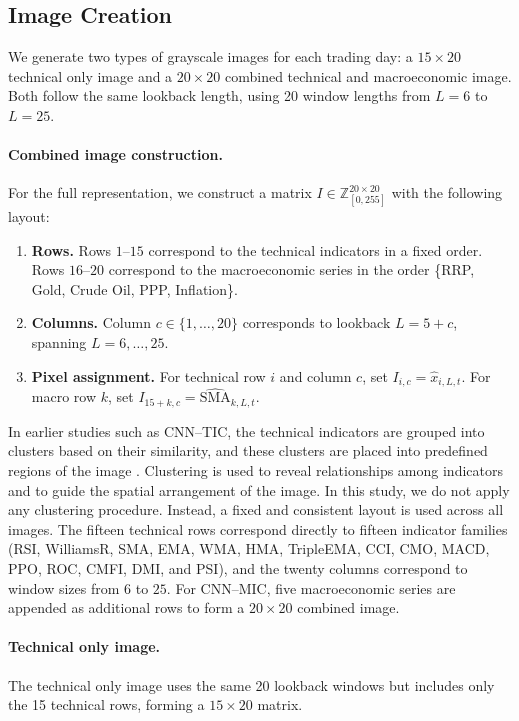 \documentclass[12pt,a4paper]{article}
\begin{document}
\subsection{Image Creation} \label{subsec:image-creation}
We generate two types of grayscale images for each trading day: a $15 \times 20$ technical only image and a $20 \times 20$ combined technical and macroeconomic image. Both follow the same lookback length, using 20 window lengths from $L = 6$ to $L = 25$.

\paragraph{Combined image construction.}
For the full representation, we construct a matrix $I \in \mathbb{Z}^{20 \times 20}_{[0,255]}$ with the following layout:
\begin{enumerate}
	\item \textbf{Rows.} Rows $1\text{–}15$ correspond to the technical indicators in a fixed order. Rows $16\text{–}20$ correspond to the macroeconomic series in the order \{RRP, Gold, Crude Oil, PPP, Inflation\}.
	\item \textbf{Columns.} Column $c \in \{1,\ldots,20\}$ corresponds to lookback $L = 5 + c$, spanning $L = 6,\ldots,25$.
	\item \textbf{Pixel assignment.} For technical row $i$ and column $c$, set $I_{i,c} = \widehat{x}_{i,L,t}$. For macro row $k$, set $I_{15+k,c} = \widehat{\mathrm{SMA}}_{k,L,t}$.
\end{enumerate}
In earlier studies such as CNN--TIC, the technical indicators are grouped into clusters based on their similarity, and these clusters are placed into predefined regions of the image \cite{maratkhan2021deep}. Clustering is used to reveal relationships among indicators and to guide the spatial arrangement of the image. In this study, we do not apply any clustering procedure. Instead, a fixed and consistent layout is used across all images. The fifteen technical rows correspond directly to fifteen indicator families (RSI, WilliamsR, SMA, EMA, WMA, HMA, TripleEMA, CCI, CMO, MACD, PPO, ROC, CMFI, DMI, and PSI), and the twenty columns correspond to window sizes from $6$ to $25$. For CNN--MIC, five macroeconomic series are appended as additional rows to form a $20 \times 20$ combined image.


\paragraph{Technical only image.}
The technical only image uses the same 20 lookback windows but includes only the 15 technical rows, forming a $15 \times 20$ matrix.
\end{document}
